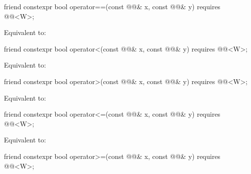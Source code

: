 \begin{itemdecl}
friend constexpr bool operator==(const @@& x, const @@& y)
  requires @@<W>;
\end{itemdecl}

\begin{itemdescr}
\pnum
\effects
Equivalent to: 
\end{itemdescr}

\begin{itemdecl}
friend constexpr bool operator<(const @@& x, const @@& y)
  requires @@<W>;
\end{itemdecl}

\begin{itemdescr}
\pnum
\effects
Equivalent to: 
\end{itemdescr}

\begin{itemdecl}
friend constexpr bool operator>(const @@& x, const @@& y)
  requires @@<W>;
\end{itemdecl}

\begin{itemdescr}
\pnum
\effects
Equivalent to: 
\end{itemdescr}

\begin{itemdecl}
friend constexpr bool operator<=(const @@& x, const @@& y)
  requires @@<W>;
\end{itemdecl}

\begin{itemdescr}
\pnum
\effects
Equivalent to: 
\end{itemdescr}

\begin{itemdecl}
friend constexpr bool operator>=(const @@& x, const @@& y)
  requires @@<W>;
\end{itemdecl}

